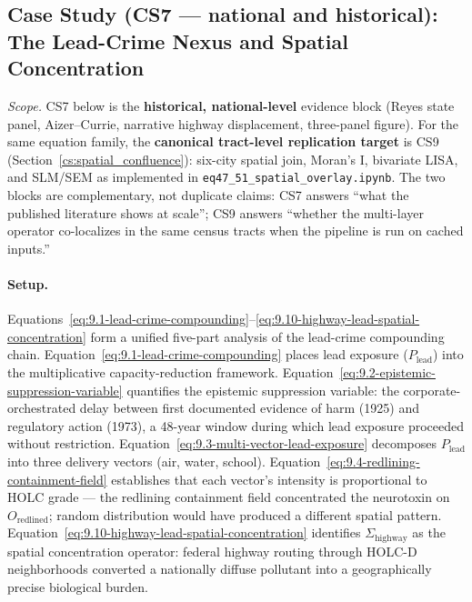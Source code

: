 \subsection*{Case Study (CS7 --- national and historical): The Lead-Crime Nexus and Spatial Concentration}
\label{cs:lead_crime}

\noindent\emph{Scope.} CS7 below is the \textbf{historical, national-level} evidence block (Reyes state panel, Aizer--Currie, narrative highway displacement, three-panel figure). For the same equation family, the \textbf{canonical tract-level replication target} is CS9 (Section~\ref{cs:spatial_confluence}): six-city spatial join, Moran's I, bivariate LISA, and SLM/SEM as implemented in \texttt{eq47\_51\_spatial\_overlay.ipynb}. The two blocks are complementary, not duplicate claims: CS7 answers ``what the published literature shows at scale''; CS9 answers ``whether the multi-layer operator co-localizes in the same census tracts when the pipeline is run on cached inputs.''

\paragraph{Setup.}
Equations~\ref{eq:9.1-lead-crime-compounding}--\ref{eq:9.10-highway-lead-spatial-concentration} form a unified five-part analysis of the lead-crime compounding chain. Equation~\ref{eq:9.1-lead-crime-compounding} places lead exposure ($P_{\text{lead}}$) into the multiplicative capacity-reduction framework. Equation~\ref{eq:9.2-epistemic-suppression-variable} quantifies the epistemic suppression variable: the corporate-orchestrated delay between first documented evidence of harm (1925) and regulatory action (1973), a 48-year window during which lead exposure proceeded without restriction. Equation~\ref{eq:9.3-multi-vector-lead-exposure} decomposes $P_{\text{lead}}$ into three delivery vectors (air, water, school). Equation~\ref{eq:9.4-redlining-containment-field} establishes that each vector's intensity is proportional to HOLC grade --- the redlining containment field concentrated the neurotoxin on $O_{\text{redlined}}$; random distribution would have produced a different spatial pattern. Equation~\ref{eq:9.10-highway-lead-spatial-concentration} identifies $\Sigma_{\text{highway}}$ as the spatial concentration operator: federal highway routing through HOLC-D neighborhoods converted a nationally diffuse pollutant into a geographically precise biological burden.

